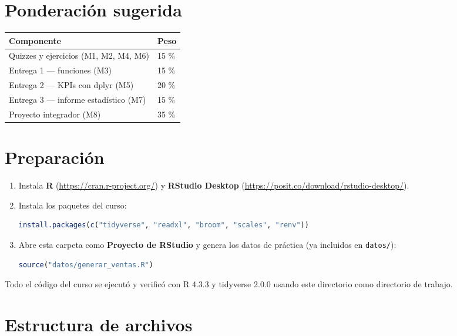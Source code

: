\section*{Ponderación sugerida}

\begin{longtable}[]{@{}ll@{}}
\toprule\noalign{}
Componente & Peso \\
\midrule\noalign{}
\endhead
\bottomrule\noalign{}
\endlastfoot
Quizzes y ejercicios (M1, M2, M4, M6) & 15 \% \\
Entrega 1 --- funciones (M3) & 15 \% \\
Entrega 2 --- KPIs con dplyr (M5) & 20 \% \\
Entrega 3 --- informe estadístico (M7) & 15 \% \\
Proyecto integrador (M8) & 35 \% \\
\end{longtable}

\section*{Preparación}

\begin{enumerate}
\def\labelenumi{\arabic{enumi}.}
\item
  Instala \textbf{R} (\url{https://cran.r-project.org/}) y
  \textbf{RStudio Desktop}
  (\url{https://posit.co/download/rstudio-desktop/}).
\item
  Instala los paquetes del curso:

\begin{lstlisting}[language=R]
install.packages(c("tidyverse", "readxl", "broom", "scales", "renv"))
\end{lstlisting}
\item
  Abre esta carpeta como \textbf{Proyecto de RStudio} y genera los datos
  de práctica (ya incluidos en \passthrough{\lstinline!datos/!}):

\begin{lstlisting}[language=R]
source("datos/generar_ventas.R")
\end{lstlisting}
\end{enumerate}

Todo el código del curso se ejecutó y verificó con R 4.3.3 y tidyverse
2.0.0 usando este directorio como directorio de trabajo.

\section*{Estructura de archivos}

